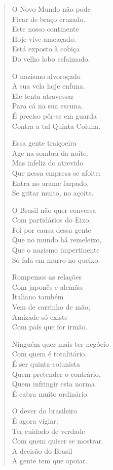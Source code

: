 \begin{verse}
O Novo Mundo não pode\\
Ficar de braço cruzado.\\
Este nosso continente\\
Hoje vive ameaçado.\\
Está exposto à cobiça\\
Do velho lobo esfaimado.

O nazismo alvoroçado\\
A sua vela hoje enfuna.\\
Ele tenta atravessar\\
Para cá na sua escuna.\\
É preciso pôr-se em guarda\\
Contra a tal Quinta Coluna.

Essa gente traiçoeira\\
Age na sombra da noite.\\
Mas infeliz do atrevido\\
Que nessa empresa se afoite:\\
Entra no arame farpado,\\
Se gritar muito, no açoite.

O Brasil não quer conversa\\
Com partidários do Eixo.\\
Foi por causa dessa gente\\
Que no mundo há remeleixo,\\
Que o nazismo impertinente\\
Só fala em murro no queixo.


Rompemos as relações\\
Com japonês e alemão.\\
Italiano também\\
Vem de carrinho de mão;\\
Amizade só existe\\
Com país que for irmão.

Ninguém quer mais ter negócio\\
Com quem é totalitário.\\
É ser quinta-colunista\\
Quem pretender o contrário.\\
Quem infringir esta norma\\
É cabra muito ordinário.

O dever do brasileiro\\
É agora vigiar;\\
Ter cuidado de verdade\\
Com quem quiser se mostrar.\\
A decisão do Brasil\\
A gente tem que apoiar.


\end{verse}
